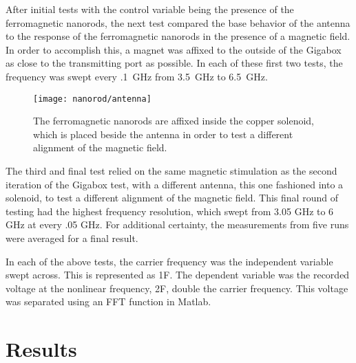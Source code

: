 After initial tests with the control variable being the presence of the ferromagnetic nanorods, the next test compared the base behavior of the antenna to the response of the ferromagnetic nanorods in the presence of a magnetic field. In order to accomplish this, a magnet was affixed to the outside of the Gigabox as close to the transmitting port as possible. In each of these first two tests, the frequency was swept every .1~GHz from 3.5~GHz to 6.5~GHz.

\begin{figure}[h!]
\centering
\texttt{[image: nanorod/antenna]}
    \caption[Antenna used with ferromagnetic nanorods in the Gigabox]{The ferromagnetic nanorods are affixed inside the copper solenoid, which is placed beside the antenna in order to test a different alignment of the magnetic field.}
    \label{fig:nanorod-setup}
\end{figure}

The third and final test relied on the same magnetic stimulation as the second iteration of the Gigabox test, with a different antenna, this one fashioned into a solenoid, to test a different alignment of the magnetic field. This final round of testing had the highest frequency resolution, which swept from 3.05 GHz to 6 GHz at every .05 GHz. For additional certainty, the measurements from five runs were averaged for a final result.

In each of the above tests, the carrier frequency was the independent variable swept across. This is represented as 1F. The dependent variable was the recorded voltage at the nonlinear frequency, 2F, double the carrier frequency. This voltage was separated using an FFT function in Matlab.

\section{Results}
\label{sec:nanorod-results}

